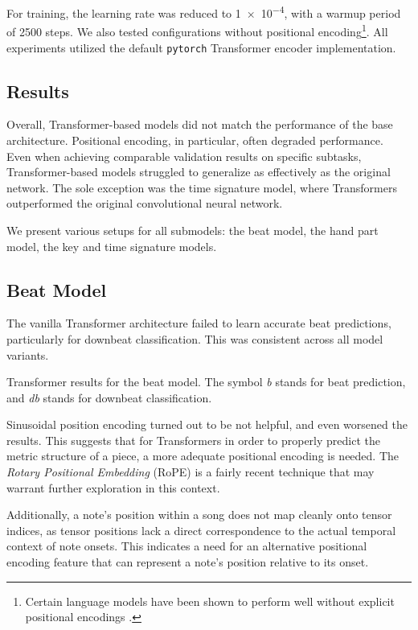 For training, the learning rate was reduced to \num{1e-4}, with a warmup period of 2500 steps. We also tested configurations without positional encoding\footnote{Certain language models have been shown to perform well without explicit positional encodings \cite{Haviv2022}.}. All experiments utilized the default \texttt{pytorch} Transformer encoder implementation.

\subsection{Results}

Overall, Transformer-based models did not match the performance of the base architecture. Positional encoding, in particular, often degraded performance. Even when achieving comparable validation results on specific subtasks, Transformer-based models struggled to generalize as effectively as the original network. The sole exception was the time signature model, where Transformers outperformed the original convolutional neural network.

We present various setups for all submodels: the beat model, the hand part model, the key and time signature models.

\subsection{Beat Model}

The vanilla Transformer architecture failed to learn accurate beat predictions, particularly for downbeat classification. This was consistent across all model variants.

\begin{table}[ht!]
\centering

\caption[Transformer results for the beat model.]{Transformer results for the beat model. The symbol \emph{b} stands for beat prediction, and \emph{db} stands for downbeat classification.}
\label{beat_transformer}
\end{table}

Sinusoidal position encoding turned out to be not helpful, and even worsened the results. This suggests that for Transformers in order to properly predict the metric structure of a piece, a more adequate positional encoding is needed. The \emph{Rotary Positional Embedding} (RoPE) \cite{Su2024} is a fairly recent technique that may warrant further exploration in this context.

Additionally, a note’s position within a song does not map cleanly onto tensor indices, as tensor positions lack a direct correspondence to the actual temporal context of note onsets. This indicates a need for an alternative positional encoding feature that can represent a note’s position relative to its onset.

